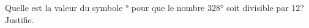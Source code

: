 %
%
Quelle est la valeur du symbole ° pour que le nombre 328° soit divisible par 12? Justifie.\\ %
    \dotfillbox[\linewidth]\par\dotfillbox[\linewidth]\par\dotfillbox[\linewidth]\par\dotfillbox[\linewidth]\par\dotfillbox[\linewidth]\dotfillbox[\linewidth]\par\dotfillbox[\linewidth]\par\dotfillbox[\linewidth]\par\dotfillbox[\linewidth]\par\dotfillbox[\linewidth]
